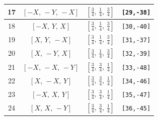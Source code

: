 \documentclass[fleqn,8pt]{jsarticle}
\begin{document}
\begin{longtable}{cccc}
17 & $\left[ - X,\, - Y,\, - X \right]$ & $\left[ \frac{3}{4},\, \frac{1}{4},\, \frac{3}{4} \right]$ & {\tt [29,-38]} \\ \hline
18 & $\left[ - X,\, Y,\, X \right]$ & $\left[ \frac{3}{4},\, \frac{1}{4},\, \frac{3}{4} \right]$ & {\tt [30,-40]} \\ \hline
19 & $\left[ X,\, Y,\, - X \right]$ & $\left[ \frac{3}{4},\, \frac{1}{4},\, \frac{3}{4} \right]$ & {\tt [31,-37]} \\ \hline
20 & $\left[ X,\, - Y,\, X \right]$ & $\left[ \frac{3}{4},\, \frac{1}{4},\, \frac{3}{4} \right]$ & {\tt [32,-39]} \\ \hline
21 & $\left[ - X,\, - X,\, - Y \right]$ & $\left[ \frac{3}{4},\, \frac{3}{4},\, \frac{1}{4} \right]$ & {\tt [33,-48]} \\ \hline
22 & $\left[ X,\, - X,\, Y \right]$ & $\left[ \frac{3}{4},\, \frac{3}{4},\, \frac{1}{4} \right]$ & {\tt [34,-46]} \\ \hline
23 & $\left[ - X,\, X,\, Y \right]$ & $\left[ \frac{3}{4},\, \frac{3}{4},\, \frac{1}{4} \right]$ & {\tt [35,-47]} \\ \hline
24 & $\left[ X,\, X,\, - Y \right]$ & $\left[ \frac{3}{4},\, \frac{3}{4},\, \frac{1}{4} \right]$ & {\tt [36,-45]} \\
\end{longtable}
\renewcommand{\arraystretch}{1.2}
\end{document}
